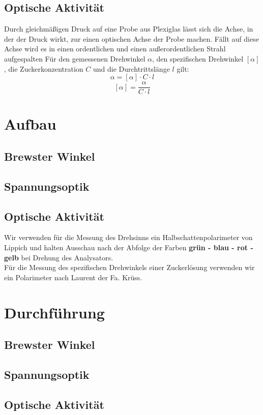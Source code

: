 \documentclass[twoside]{article}
\begin{document}
\subsection{Optische Aktivität}
Durch gleichmäßigen Druck auf eine Probe aus Plexiglas lässt sich die Achse, in der der Druck wirkt, zur einen optischen Achse der Probe machen. Fällt auf diese Achse wird es in einen ordentlichen und einen außerordentlichen Strahl aufgespalten
Für den gemessenen Drehwinkel $\alpha$, den spezifischen Drehwinkel $[\alpha]$, die Zuckerkonzentration $C$ und die Durchtrittslänge $l$ gilt:
\begin{equation*}
\alpha=[\alpha]\cdot C \cdot l
\end{equation*} 
\begin{equation}
\label{eq:SpezDrehwinkel}
[\alpha]=\frac{\alpha}{ C \cdot l }
\end{equation} 
\section{Aufbau}
\subsection{Brewster Winkel}
\subsection{Spannungsoptik}
\subsection{Optische Aktivität}
Wir verwenden für die Messung des Drehsinns ein Halbschattenpolarimeter von Lippich und halten Ausschau nach der Abfolge der Farben \textbf{grün - blau - rot - gelb} bei Drehung des Analysators.\\
Für die Messung des spezifischen Drehwinkels einer Zuckerlösung verwenden wir ein Polarimeter nach Laurent der Fa. Krüss.
\section{Durchführung}
\subsection{Brewster Winkel}
\subsection{Spannungsoptik}
\subsection{Optische Aktivität}
\end{document}
